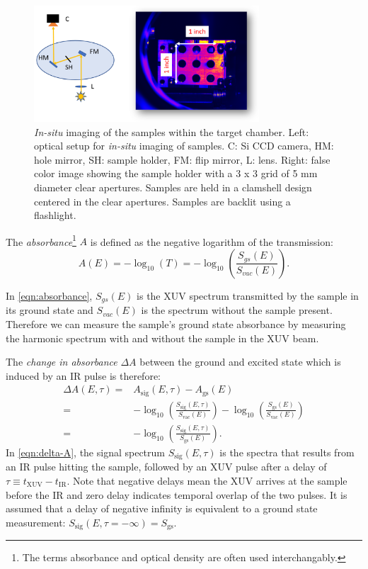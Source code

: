 \begin{figure}
	\centering
	\includegraphics[width=0.75\textwidth]{figures/chap3/sample_holder.png}
	\caption{\textit{In-situ} imaging of the samples within the target chamber. Left: optical setup for \textit{in-situ} imaging of samples. C: Si CCD camera, HM: hole mirror, SH: sample holder, FM: flip mirror, L: lens. Right: false color image showing the sample holder with a 3 x 3 grid of 5 mm diameter clear apertures. Samples are held in a clamshell design centered in the clear apertures. Samples are backlit using a flashlight.}
	\label{fig:sample_holder}
\end{figure}

The \textit{absorbance}\footnote{The terms absorbance and optical density are often used interchangably.} $A$ is defined as the negative logarithm of the transmission:
\begin{equation}
A(E) = -\log_{10} \left( T \right) = -\log_{10} \left(\frac{S_{gs}(E)}{S_{vac}(E)} \right).
\label{eqn:absorbance}
\end{equation}

In \cref{eqn:absorbance}, $S_{gs}(E)$ is the XUV spectrum transmitted by the sample in its ground state and $S_{vac}(E)$ is the spectrum without the sample present. Therefore we can measure the sample's ground state absorbance by measuring the harmonic spectrum with and without the sample in the XUV beam.

The \textit{change in absorbance} $\Delta A$ between the ground and excited state which is induced by an IR pulse is therefore:
\begin{equation}
\begin{aligned}
\Delta A(E,\tau) = & A_{\text{sig}}(E,\tau) - A_{\text{gs}}(E) \\
= & -\log_{10} \left(\frac{S_{\text{sig}}(E,\tau)}{S_{\text{vac}}(E)} \right) -  \log_{10} \left(\frac{S_{\text{gs}}(E)}{S_{\text{vac}}(E)} \right) \\
= & -\log_{10} \left(\frac{S_{\text{sig}}(E,\tau)}{S_{\text{gs}}(E)} \right).
\end{aligned}
\label{eqn:delta-A}
\end{equation}
In \cref{eqn:delta-A}, the signal spectrum $S_{\text{sig}}(E,\tau)$ is the spectra that results from an IR pulse hitting the sample, followed by an XUV pulse after a delay of $\tau \equiv t_{\text{XUV}} - t_{\text{IR}}$. Note that negative delays mean the XUV arrives at the sample before the IR and zero delay indicates temporal overlap of the two pulses. It is assumed that a delay of negative infinity is equivalent to a ground state measurement: $S_{\text{sig}}(E,\tau=-\infty) = S_{\text{gs}}$.


